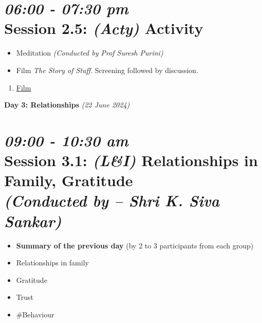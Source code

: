 \documentclass[11pt]{article}
\begin{document}
    \section*{{\it 06:00 - 07:30 pm} \\
    Session 2.5: {\it (Acty)} Activity}

    \begin{itemize}
        \item Meditation {\em (Conducted by Prof Suresh Purini)}
        \item Film {\em The Story of Stuff}. Screening followed by discussion.
    \end{itemize}

    \begin{enumerate}
        \item \href{https://www.youtube.com/watch?v=j_n39kTwpu0}{Film}
    \end{enumerate}

    \begin{center}
        \vspace{10mm}
        {\LARGE {\bf Day 3: Relationships} {\em (22 June 2024)} }\\
    \end{center}


    \section*{{\it 09:00 - 10:30 am} \\
    Session 3.1: {\it (L\&I)} {\bf Relationships in Family, Gratitude} \\
    {\Large\it (Conducted by -- Shri K. Siva Sankar)}}


    \begin{itemize}
        \item {\bf Summary of the previous day} (by 2 to 3 participants from each group)
        \item Relationships in family
        \item Gratitude
        \item Trust
        \item \#Behaviour
    \end{itemize}
\end{document}
